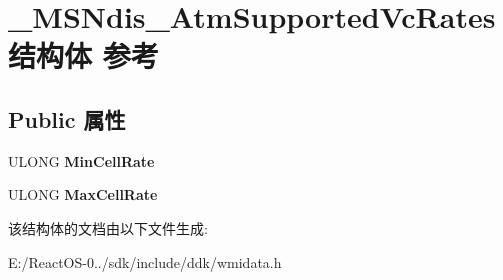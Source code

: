 \hypertarget{struct___m_s_ndis___atm_supported_vc_rates}{}\section{\+\_\+\+M\+S\+Ndis\+\_\+\+Atm\+Supported\+Vc\+Rates结构体 参考}
\label{struct___m_s_ndis___atm_supported_vc_rates}
\subsection*{Public 属性}
\begin{DoxyCompactItemize}
\item 
\mbox{\label{struct___m_s_ndis___atm_supported_vc_rates_a43ec0adff40b04dc61d4d25e133a0449}} 
U\+L\+O\+NG {\bfseries Min\+Cell\+Rate}
\item 
\mbox{\label{struct___m_s_ndis___atm_supported_vc_rates_ad3dd04902010b39f117975f054bf01bf}} 
U\+L\+O\+NG {\bfseries Max\+Cell\+Rate}
\end{DoxyCompactItemize}


该结构体的文档由以下文件生成\+:\begin{DoxyCompactItemize}
\item 
E\+:/\+React\+O\+S-\/0../sdk/include/ddk/wmidata.\+h\end{DoxyCompactItemize}
